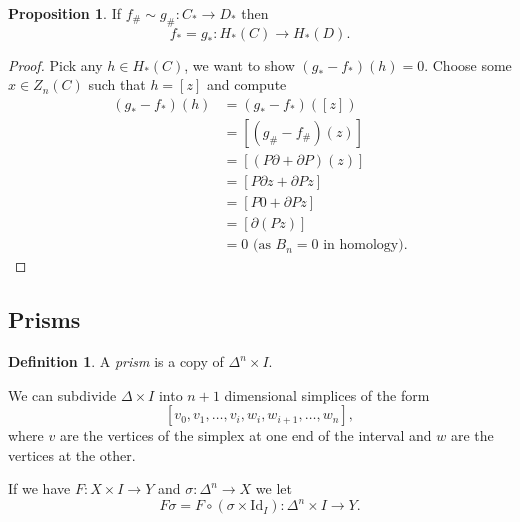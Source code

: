 \documentclass[12pt]{article}
\theoremstyle{definition}
\newtheorem*{prop}{Proposition}
\theoremstyle{definition}
\newtheorem*{defn}{Definition}
\newcommand{\C}{C_*}
\renewcommand{\H}{H_*}
\begin{document}
\begin{prop}
If $f_\#\sim g_\#\colon \C \to D_*$ then 
\[
f_* = g_* \colon \H(C) \to \H(D).
\]
\end{prop}
\begin{proof}
Pick any $h\in\H(C)$, we want to show $(g_* - f_*)(h) = 0$.
Choose some $x\in Z_n(C)$ such that $h = [z]$ and compute
\begin{align*}
(g_* - f_*)(h) &= (g_* - f_*)([z])\\
 &= [(g_\#- f_\#)(z)]\\
 &= [(P\partial + \partial P)(z)]\\
 &= [P\partial z + \partial Pz]\\
 &= [P0 + \partial Pz]\\
 &= [\partial(Pz)]\\
 &= 0\text{ (as }B_n = 0\text{ in homology)}.
\end{align*}
\end{proof}

\subsection{Prisms}
\begin{defn}
A \emph{prism} is a copy of $\Delta^n \times I$.
\end{defn}

We can subdivide $\Delta\times I$ into $n+1$ dimensional simplices of the form
\[
[v_0,v_1,\ldots,v_i,w_i,w_{i+1},\ldots,w_n],
\]
where $v$ are the vertices of the simplex at one end of the interval and $w$ are the vertices at the other.

If we have $F\colon X\times I \to Y$ and $\sigma\colon \Delta^n \to X$ we let
\[
F\sigma = F\circ(\sigma \times \mathrm{Id}_I)\colon \Delta^n \times I \to Y.
\]
\end{document}
